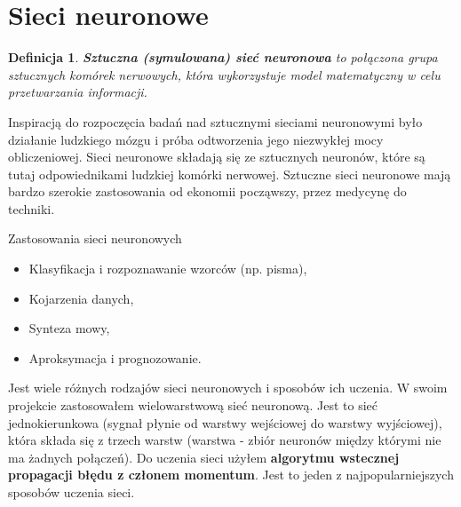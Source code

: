 \documentclass[a4paper,10pt]{beamer}
\newtheorem{defi}{Definicja}[subsection]
\begin{document}
		
		\section{Sieci neuronowe}
		
		\begin{frame}
			\begin{defi}
				\textbf{Sztuczna (symulowana) sieć neuronowa} to połączona grupa sztucznych komórek nerwowych, która wykorzystuje model matematyczny w celu przetwarzania informacji.
			\end{defi}
			 Inspiracją do rozpoczęcia badań nad sztucznymi sieciami neuronowymi było działanie ludzkiego mózgu i próba odtworzenia jego niezwykłej mocy obliczeniowej. Sieci neuronowe składają się ze sztucznych neuronów, które są tutaj odpowiednikami ludzkiej komórki nerwowej. Sztuczne sieci neuronowe mają bardzo szerokie zastosowania od ekonomii począwszy, przez medycynę do techniki.
			
		\end{frame}
		\begin{frame}{Zastosowania sieci neuronowych}
				\begin{itemize}
					\item{Klasyfikacja i rozpoznawanie wzorców (np. pisma),}
					\item{Kojarzenia danych,}
					\item{Synteza mowy,}
					\item{Aproksymacja i prognozowanie.}
				\end{itemize}
		\end{frame}
		\begin{frame}
			Jest wiele różnych rodzajów sieci neuronowych i sposobów ich uczenia. W swoim projekcie zastosowałem wielowarstwową sieć neuronową. Jest to sieć jednokierunkowa (sygnał płynie od warstwy wejściowej do warstwy wyjściowej), która składa się z trzech warstw (warstwa - zbiór neuronów między którymi nie ma żadnych połączeń). Do uczenia sieci użyłem \textbf{algorytmu wstecznej propagacji błędu z członem momentum}. Jest to jeden z najpopularniejszych sposobów uczenia sieci.
		\end{frame}
\end{document}
